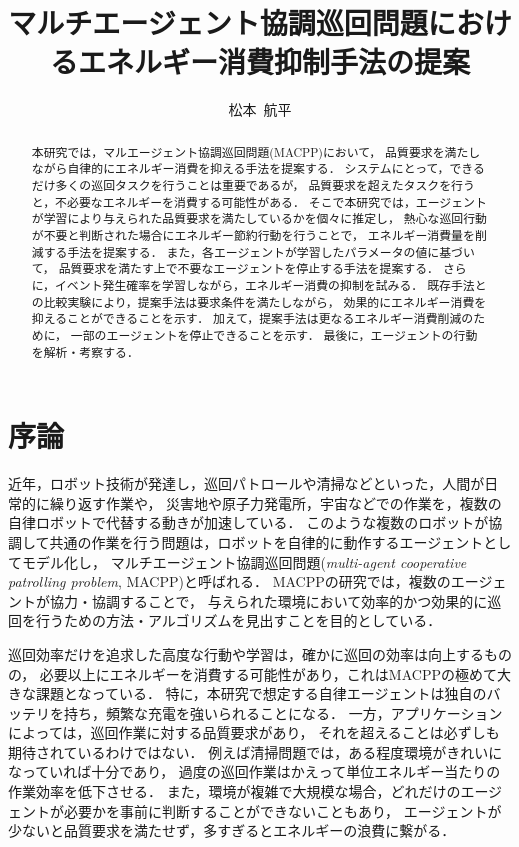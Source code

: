 \documentclass[12pt,a4j,twoside]{jarticle}
\title{マルチエージェント協調巡回問題におけるエネルギー消費抑制手法の提案}{5}
\author{松本~航平}
\begin{document}
\maketitle

\begin{abstract}
  本研究では，マルエージェント協調巡回問題(MACPP)において，
  品質要求を満たしながら自律的にエネルギー消費を抑える手法を提案する．
  システムにとって，できるだけ多くの巡回タスクを行うことは重要であるが，
  品質要求を超えたタスクを行うと，不必要なエネルギーを消費する可能性がある．
  そこで本研究では，エージェントが学習により与えられた品質要求を満たしているかを個々に推定し，
  熱心な巡回行動が不要と判断された場合にエネルギー節約行動を行うことで，
  エネルギー消費量を削減する手法を提案する．
  また，各エージェントが学習したパラメータの値に基づいて，
  品質要求を満たす上で不要なエージェントを停止する手法を提案する．
  さらに，イベント発生確率を学習しながら，エネルギー消費の抑制を試みる．
  既存手法との比較実験により，提案手法は要求条件を満たしながら，
  効果的にエネルギー消費を抑えることができることを示す．
  加えて，提案手法は更なるエネルギー消費削減のために，
  一部のエージェントを停止できることを示す．
  最後に，エージェントの行動を解析・考察する．
\end{abstract}

\vspace*{1cm}\par
\section{序論}\label{sec:introduction}
近年，ロボット技術が発達し，巡回パトロールや清掃などといった，人間が日常的に繰り返す作業や，
災害地や原子力発電所，宇宙などでの作業を，複数の自律ロボットで代替する動きが加速している．
このような複数のロボットが協調して共通の作業を行う問題は，ロボットを自律的に動作するエージェントとしてモデル化し，
マルチエージェント協調巡回問題({\em multi-agent cooperative patrolling problem}, MACPP)と呼ばれる．
MACPPの研究では，複数のエージェントが協力・協調することで，
与えられた環境において効率的かつ効果的に巡回を行うための方法・アルゴリズムを見出すことを目的としている．
\par

巡回効率だけを追求した高度な行動や学習は，確かに巡回の効率は向上するものの，
必要以上にエネルギーを消費する可能性があり，これはMACPPの極めて大きな課題となっている．
特に，本研究で想定する自律エージェントは独自のバッテリを持ち，頻繁な充電を強いられることになる．
一方，アプリケーションによっては，巡回作業に対する品質要求があり，
それを超えることは必ずしも期待されているわけではない．
例えば清掃問題では，ある程度環境がきれいになっていれば十分であり，
過度の巡回作業はかえって単位エネルギー当たりの作業効率を低下させる．
また，環境が複雑で大規模な場合，どれだけのエージェントが必要かを事前に判断することができないこともあり，
エージェントが少ないと品質要求を満たせず，多すぎるとエネルギーの浪費に繋がる．
\par
\end{document}

